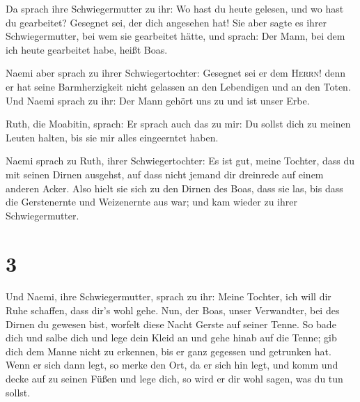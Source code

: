  Da sprach ihre Schwiegermutter zu ihr: Wo hast du heute
gelesen, und wo hast du gearbeitet? Gesegnet sei, der dich angesehen
hat! Sie aber sagte es ihrer Schwiegermutter, bei wem sie gearbeitet
hätte, und sprach: Der Mann, bei dem ich heute gearbeitet habe, heißt
Boas.

 Naemi aber sprach zu ihrer Schwiegertochter: Gesegnet
sei er dem \textsc{Herrn}! denn er hat seine Barmherzigkeit nicht
gelassen an den Lebendigen und an den Toten. Und Naemi sprach zu ihr:
Der Mann gehört uns zu und ist unser Erbe.

 Ruth, die Moabitin, sprach: Er sprach auch das zu mir:
Du sollst dich zu meinen Leuten halten, bis sie mir alles eingeerntet
haben.

 Naemi sprach zu Ruth, ihrer Schwiegertochter: Es ist
gut, meine Tochter, dass du mit seinen Dirnen ausgehst, auf dass nicht
jemand dir dreinrede auf einem anderen Acker.  Also hielt
sie sich zu den Dirnen des Boas, dass sie las, bis dass die Gerstenernte
und Weizenernte aus war; und kam wieder zu ihrer Schwiegermutter.

\hypertarget{section-2}{%
\section{3}\label{section-2}}

 Und Naemi, ihre Schwiegermutter, sprach zu ihr: Meine
Tochter, ich will dir Ruhe schaffen, dass dir's wohl gehe.
 Nun, der Boas, unser Verwandter, bei des Dirnen du
gewesen bist, worfelt diese Nacht Gerste auf seiner Tenne.
 So bade dich und salbe dich und lege dein Kleid an und
gehe hinab auf die Tenne; gib dich dem Manne nicht zu erkennen, bis er
ganz gegessen und getrunken hat.  Wenn er sich dann legt,
so merke den Ort, da er sich hin legt, und komm und decke auf zu seinen
Füßen und lege dich, so wird er dir wohl sagen, was du tun sollst.


